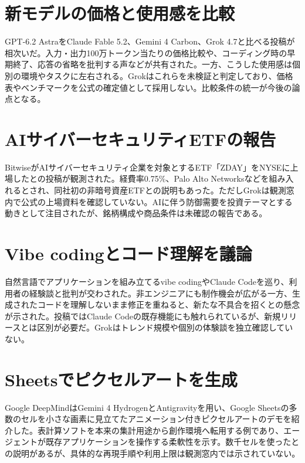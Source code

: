 \section{新モデルの価格と使用感を比較}
GPT-6.2 AstraをClaude Fable 5.2、Gemini 4 Carbon、Grok 4.7と比べる投稿が相次いだ。入力・出力100万トークン当たりの価格比較や、コーディング時の早期終了、応答の省略を批判する声などが共有された。一方、こうした使用感は個別の環境やタスクに左右される。Grokはこれらを未検証と判定しており、価格表やベンチマークを公式の確定値として採用しない。比較条件の統一が今後の論点となる。

\section{AIサイバーセキュリティETFの報告}
BitwiseがAIサイバーセキュリティ企業を対象とするETF「ZDAY」をNYSEに上場したとの投稿が観測された。経費率0.75\%、Palo Alto Networksなどを組み入れるとされ、同社初の非暗号資産ETFとの説明もあった。ただしGrokは観測窓内で公式の上場資料を確認していない。AIに伴う防御需要を投資テーマとする動きとして注目されたが、銘柄構成や商品条件は未確認の報告である。

\section{Vibe codingとコード理解を議論}
自然言語でアプリケーションを組み立てるvibe codingやClaude Codeを巡り、利用者の経験談と批判が交わされた。非エンジニアにも制作機会が広がる一方、生成されたコードを理解しないまま修正を重ねると、新たな不具合を招くとの懸念が示された。投稿ではClaude Codeの既存機能にも触れられているが、新規リリースとは区別が必要だ。Grokはトレンド規模や個別の体験談を独立確認していない。

\section{Sheetsでピクセルアートを生成}
Google DeepMindはGemini 4 HydrogenとAntigravityを用い、Google Sheetsの多数のセルを小さな画素に見立てたアニメーション付きピクセルアートのデモを紹介した。表計算ソフトを本来の集計用途から創作環境へ転用する例であり、エージェントが既存アプリケーションを操作する柔軟性を示す。数千セルを使ったとの説明があるが、具体的な再現手順や利用上限は観測窓内では示されていない。
